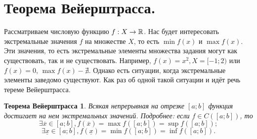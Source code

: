 \section{Теорема Вейерштрасса.}
Рассматриваем числовую функцию $f: X \rightarrow \mathbb{R}$. Нас будет интересовать экстремальные значения $f$ на множестве $X$, то есть $\min f(x)$ и $\max f(x)$. Эти значения, то есть экстремальные элементы множества задания могут как существовать, так и не существовать. Например, $f(x) = x^2, X = [-1; 2)$ или $f(x) = 0$, $\max f(x) - \nexists$. Однако есть ситуации, когда экстремальные элементы заведомо существуют. Как раз об одной такой ситуации и идёт речь тереме Вейерштрасса.  
\newtheorem*{theor}{Теорема Вейерштрасса}\begin{theor}
	Всякая непрерывная на отрезке $[a; b]$ функция достигает на нем экстремальных значений. 
	Подробнее: если $f \in C([a; b])$, то
	$$\exists \overline{x} \in [a; b], f(\overline{x}) = \max f([a; b]) = \sup f([a; b]);$$
	$$\exists \underline{x} \in [a; b], f(\underline{x}) = \min f([a; b]) = \inf f([a; b]).$$
\end{theor}
